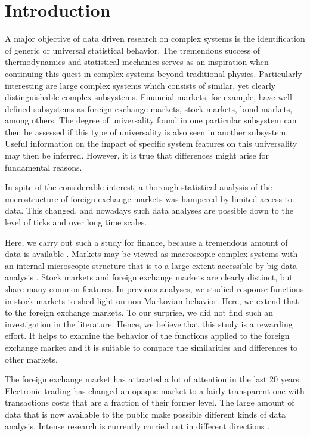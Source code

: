 \section{Introduction}\label{sec:introduction}

A major objective of data driven research on complex systems is the
identification of generic or universal statistical behavior. The tremendous
success of thermodynamics and statistical mechanics serves as an inspiration
when continuing this quest in complex systems beyond traditional physics.
Particularly interesting are large complex systems which consists of similar,
yet clearly distinguishable complex subsystems. Financial markets, for example,
have well defined subsystems as foreign exchange markets, stock markets, bond
markets, among others. The degree of universality found in one particular
subsystem can then be assessed if this type of universality is also seen in
another subsystem. Useful information on the impact of specific system features
on this universality may then be inferred. However, it is true that differences
might arise for fundamental reasons.

In spite of the considerable interest, a thorough statistical analysis of
the microstructure of foreign exchange markets was hampered by limited access
to data. This changed, and nowadays such data analyses are possible down to the
level of ticks and over long time scales.

Here, we carry out such a study for finance, because a tremendous amount of
data is available \cite{physicists_contribution}. Markets may be viewed as
macroscopic complex systems with an internal microscopic structure that is to a
large extent accessible by big data analysis \cite{complex_markets}.
Stock markets and foreign exchange markets are clearly distinct, but share many
common features. In previous analyses, we studied response functions in stock
markets to shed light on non-Markovian behavior. Here, we extend that to the
foreign exchange markets. To our surprise, we did not find such an
investigation in the literature. Hence, we believe that this study is a
rewarding effort. It helps to examine the behavior of the functions applied to
the foreign exchange market and it is suitable to compare the similarities and
differences to other markets.

The foreign exchange market has attracted a lot of attention in the last 20
years. Electronic trading has changed an opaque market to a fairly transparent
one with transactions costs that are a fraction of their former level. The
large amount of data that is now available to the public make possible
different kinds of data analysis. Intense research is currently carried out in
different directions
\cite{forex_liquidity,info_forex,intraday_forex,forex_structure,teach_spread,forex_microstructure,electronic_forex,forex_algorithmic,curr_speculation,patterns_forex,eur_change_forex,spread_competition,political_forex,forex_volatility,local_forex,forex_inefficiency}.

